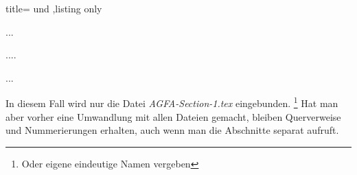 %
\begin{tcblisting}{title=  und ,listing only}

...

....
	
	
...
\end{tcblisting}
%
In diesem Fall wird nur die Datei \emph{AGFA-Section-1.tex} eingebunden.%
\footnote{Oder eigene eindeutige Namen vergeben}
Hat man aber vorher eine Umwandlung mit allen Dateien gemacht, bleiben Querverweise und Nummerierungen erhalten, auch wenn man die Abschnitte separat aufruft.
